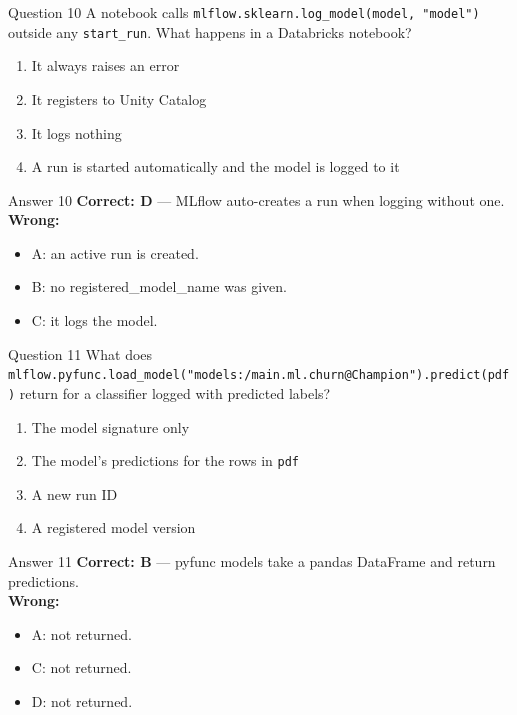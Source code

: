 \documentclass[aspectratio=169,11pt]{beamer}
\begin{document}
\begin{frame}{Question 10}
A notebook calls \texttt{mlflow.sklearn.log\_model(model, "model")} outside any \texttt{start\_run}. What happens in a Databricks notebook?
\begin{enumerate}[label=\Alph*.]
\item It always raises an error
\item It registers to Unity Catalog
\item It logs nothing
\item A run is started automatically and the model is logged to it
\end{enumerate}
\end{frame}
\begin{frame}{Answer 10}
\textbf{Correct: D} --- MLflow auto-creates a run when logging without one.\\
\vspace{0.5em}
\textbf{Wrong:}
\begin{itemize}
\item A: an active run is created.
\item B: no registered\_model\_name was given.
\item C: it logs the model.
\end{itemize}
\end{frame}

\begin{frame}{Question 11}
What does \texttt{mlflow.pyfunc.load\_model("models:/main.ml.churn@Champion").predict(pdf)} return for a classifier logged with predicted labels?
\begin{enumerate}[label=\Alph*.]
\item The model signature only
\item The model's predictions for the rows in \texttt{pdf}
\item A new run ID
\item A registered model version
\end{enumerate}
\end{frame}
\begin{frame}{Answer 11}
\textbf{Correct: B} --- pyfunc models take a pandas DataFrame and return predictions.\\
\vspace{0.5em}
\textbf{Wrong:}
\begin{itemize}
\item A: not returned.
\item C: not returned.
\item D: not returned.
\end{itemize}
\end{frame}
\end{document}
